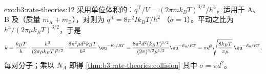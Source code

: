 \begin{solution}{exo:b3:rate-theories:12}
采用单位体积的：$q^{\mathrm T}/V = (2\pi mk_BT)^{3/2}/h^3$，适用于
A、B 及（质量 $m_{\mathrm A} + m_{\mathrm B}$），对则为 $q^{\mathrm R} = 8\pi^2Ik_BT/h^2$
（$\sigma = 1$）。平动之比为 $h^3/(2\pi\mu k_BT)^{3/2}$，于是
\[
  k = \frac{k_BT}{h}\cdot\frac{h^3}{(2\pi\mu k_BT)^{3/2}}\cdot\frac{8\pi^2\mu d^2k_BT}{h^2}\,\eu^{-E_0/RT}
    = \frac{8\pi^2d^2(k_BT)^{1/2}}{(2\pi)^{3/2}\mu^{1/2}}\eu^{-E_0/RT}
    = \pi d^2\sqrt{\frac{8k_BT}{\pi\mu}}\,\eu^{-E_0/RT},
\]
每对分子；乘以 $N_A$ 即得 \cref{thm:b3:rate-theories:collision}
其中 $\sigma = \pi d^2$。
\end{solution}

